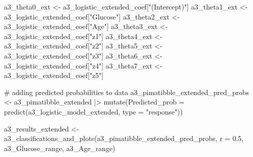 \documentclass[
  english,
  11pt,
]{article}
\newenvironment{Shaded}{\begin{snugshade}}{\end{snugshade}}
\newcommand{\AttributeTok}[1]{\textcolor[rgb]{0.40,0.45,0.13}{#1}}
\newcommand{\CommentTok}[1]{\textcolor[rgb]{0.37,0.37,0.37}{#1}}
\newcommand{\FloatTok}[1]{\textcolor[rgb]{0.68,0.00,0.00}{#1}}
\newcommand{\FunctionTok}[1]{\textcolor[rgb]{0.28,0.35,0.67}{#1}}
\newcommand{\NormalTok}[1]{\textcolor[rgb]{0.00,0.23,0.31}{#1}}
\newcommand{\OtherTok}[1]{\textcolor[rgb]{0.00,0.23,0.31}{#1}}
\newcommand{\SpecialCharTok}[1]{\textcolor[rgb]{0.37,0.37,0.37}{#1}}
\newcommand{\StringTok}[1]{\textcolor[rgb]{0.13,0.47,0.30}{#1}}
\begin{document}
\begin{Shaded}
\begin{Highlighting}[]
\NormalTok{a3\_theta0\_ext }\OtherTok{\textless{}{-}}\NormalTok{ a3\_logistic\_extended\_coef[}\StringTok{"(Intercept)"}\NormalTok{]}
\NormalTok{a3\_theta1\_ext }\OtherTok{\textless{}{-}}\NormalTok{ a3\_logistic\_extended\_coef[}\StringTok{"Glucose"}\NormalTok{]}
\NormalTok{a3\_theta2\_ext }\OtherTok{\textless{}{-}}\NormalTok{ a3\_logistic\_extended\_coef[}\StringTok{"Age"}\NormalTok{]}
\NormalTok{a3\_theta3\_ext }\OtherTok{\textless{}{-}}\NormalTok{ a3\_logistic\_extended\_coef[}\StringTok{"z1"}\NormalTok{]}
\NormalTok{a3\_theta4\_ext }\OtherTok{\textless{}{-}}\NormalTok{ a3\_logistic\_extended\_coef[}\StringTok{"z2"}\NormalTok{]}
\NormalTok{a3\_theta5\_ext }\OtherTok{\textless{}{-}}\NormalTok{ a3\_logistic\_extended\_coef[}\StringTok{"z3"}\NormalTok{]}
\NormalTok{a3\_theta6\_ext }\OtherTok{\textless{}{-}}\NormalTok{ a3\_logistic\_extended\_coef[}\StringTok{"z4"}\NormalTok{]}
\NormalTok{a3\_theta7\_ext }\OtherTok{\textless{}{-}}\NormalTok{ a3\_logistic\_extended\_coef[}\StringTok{"z5"}\NormalTok{]}


\CommentTok{\# adding predicted probabilities to data}
\NormalTok{a3\_pimatibble\_extended\_pred\_probs }\OtherTok{\textless{}{-}}
\NormalTok{  a3\_pimatibble\_extended }\SpecialCharTok{|\textgreater{}}
  \FunctionTok{mutate}\NormalTok{(}\AttributeTok{Predicted\_prob =} \FunctionTok{predict}\NormalTok{(a3\_logistic\_model\_extended, }\AttributeTok{type =} \StringTok{"response"}\NormalTok{))}



\NormalTok{a3\_results\_extended }\OtherTok{\textless{}{-}}
  \FunctionTok{a3\_classifications\_and\_plots}\NormalTok{(a3\_pimatibble\_extended\_pred\_probs,}
                               \AttributeTok{r =} \FloatTok{0.5}\NormalTok{,}
\NormalTok{                               a3\_Glucose\_range, a3\_Age\_range)}
\end{Highlighting}
\end{Shaded}
\end{document}
